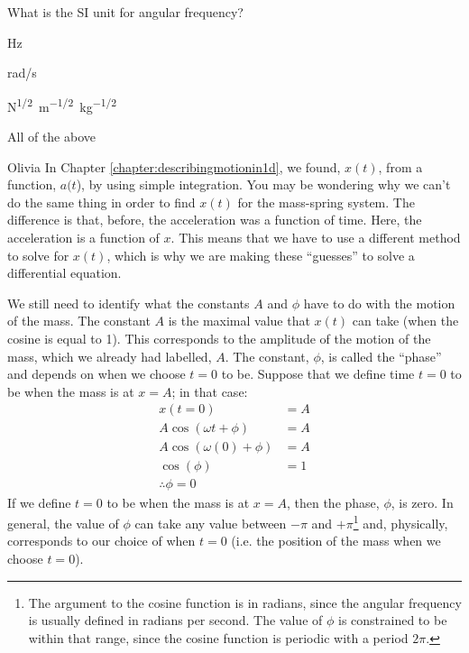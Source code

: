 \begin{checkpoint}\label{cp:simpleharmonicmotion:omega}
\begin{MCquestion}{What is the SI unit for angular frequency?}
\item \si{Hz}
\item \si{rad/s}
\item \si{N^{1/2}m^{-1/2}kg^{-1/2}}
\item All of the above \correct
\end{MCquestion}
\end{checkpoint}

\begin{studentOpinion}{Olivia}
In Chapter \ref{chapter:describingmotionin1d}, we found, $x(t)$, from a function, $a(t$), by using simple integration. You may be wondering why we can't do the same thing in order to find $x(t)$ for the mass-spring system. The difference is that, before, the acceleration was a function of time. Here, the acceleration is a function of $x$. This means that we have to use a different method to solve for $x(t)$, which is why we are making these ``guesses'' to solve a differential equation. 
\end{studentOpinion}

We still need to identify what the constants $A$ and $\phi$ have to do with the motion of the mass. The constant $A$ is the maximal value that $x(t)$ can take (when the cosine is equal to 1). This corresponds to the amplitude of the motion of the mass, which we already had labelled, $A$. The constant, $\phi$, is called the ``phase'' and depends on when we choose $t=0$ to be. Suppose that we define time $t=0$ to be when the mass is at $x=A$; in that case:
\begin{align*}
x(t=0) &= A\\
A \cos(\omega t + \phi) &= A\\
A \cos(\omega (0) + \phi) &= A\\
\cos(\phi) &= 1\\
\therefore \phi = 0
\end{align*}
If we define $t=0$ to be when the mass is at $x=A$, then the phase, $\phi$, is zero. In general, the value of $\phi$ can take any value between $-\pi$ and $+\pi$\footnote{The argument to the cosine function is in radians, since the angular frequency is usually defined in radians per second. The value of $\phi$ is constrained to be within that range, since the cosine function is periodic with a period $2\pi$.} and, physically, corresponds to our choice of when $t=0$ (i.e. the position of the mass when we choose $t=0$).

